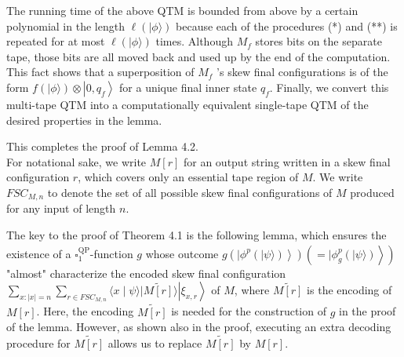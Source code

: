 \documentclass[10pt]{article}
\begin{document}
The running time of the above QTM is bounded from above by a certain polynomial in the length $\ell(|\phi\rangle)$ because each of the procedures (*) and (**) is repeated for at most $\ell(|\phi\rangle)$ times. Although $M_{f}$ stores bits on the separate tape, those bits are all moved back and used up by the end of the computation. This fact shows that a superposition of $M_{f}$ 's skew final configurations is of the form $f(|\phi\rangle) \otimes\left|0, q_{f}\right\rangle$ for a unique final inner state $q_{f}$. Finally, we convert this multi-tape QTM into a computationally equivalent single-tape QTM of the desired properties in the lemma.

This completes the proof of Lemma 4.2.\\
For notational sake, we write $M[r]$ for an output string written in a skew final configuration $r$, which covers only an essential tape region of $M$. We write $F S C_{M, n}$ to denote the set of all possible skew final configurations of $M$ produced for any input of length $n$.

The key to the proof of Theorem 4.1 is the following lemma, which ensures the existence of a $\widehat{\square_{1}^{\mathrm{QP}}}$-function $g$ whose outcome $\left.\left.g\left(\mid \phi^{p}(|\psi\rangle)\right\rangle\right)\left(=\mid \phi_{g}^{p}(|\psi\rangle)\right\rangle\right)$ "almost" characterize the encoded skew final configuration $\sum_{x:|x|=n} \sum_{r \in F S C_{M, n}}\langle x \mid \psi\rangle|\widetilde{M[r]}\rangle\left|\xi_{x, r}\right\rangle$ of $M$, where $\widetilde{M[r]}$ is the encoding of $M[r]$. Here, the encoding $\widetilde{M[r]}$ is needed for the construction of $g$ in the proof of the lemma. However, as shown also in the proof, executing an extra decoding procedure for $\widetilde{M[r]}$ allows us to replace $\widetilde{M[r]}$ by $M[r]$.
\end{document}
